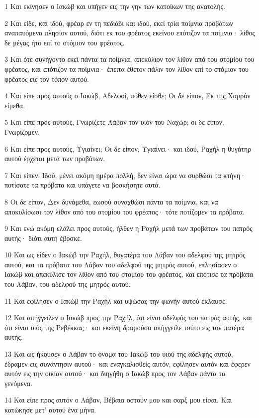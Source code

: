 \par 1 Και εκίνησεν ο Ιακώβ και υπήγεν εις την γην των κατοίκων της ανατολής.
\par 2 Και είδε, και ιδού, φρέαρ εν τη πεδιάδι και ιδού, εκεί τρία ποίμνια προβάτων αναπαυόμενα πλησίον αυτού, διότι εκ του φρέατος εκείνου επότιζον τα ποίμνια· λίθος δε μέγας ήτο επί το στόμιον του φρέατος.
\par 3 Και ότε συνήγοντο εκεί πάντα τα ποίμνια, απεκύλιον τον λίθον από του στομίου του φρέατος, και επότιζον τα ποίμνια· έπειτα έθετον πάλιν τον λίθον επί το στόμιον του φρέατος εις τον τόπον αυτού.
\par 4 Και είπε προς αυτούς ο Ιακώβ, Αδελφοί, πόθεν είσθε; Οι δε είπον, Εκ της Χαρράν είμεθα.
\par 5 Και είπε προς αυτούς, Γνωρίζετε Λάβαν τον υιόν του Ναχώρ; οι δε είπον, Γνωρίζομεν.
\par 6 Και είπε προς αυτούς, Υγιαίνει; Οι δε είπον, Υγιαίνει· και ιδού, Ραχήλ η θυγάτηρ αυτού έρχεται μετά των προβάτων.
\par 7 Και είπεν, Ιδού, μένει ακόμη ημέρα πολλή, δεν είναι ώρα να συρθώσι τα κτήνη· ποτίσατε τα πρόβατα και υπάγετε να βοσκήσητε αυτά.
\par 8 Οι δε είπον, Δεν δυνάμεθα, εωσού συναχθώσι πάντα τα ποίμνια, και να αποκυλίσωσι τον λίθον από του στομίου του φρέατος· τότε ποτίζομεν τα πρόβατα.
\par 9 Και ενώ ακόμη ελάλει προς αυτούς, ήλθεν η Ραχήλ μετά των προβάτων του πατρός αυτής· διότι αυτή έβοσκε.
\par 10 Και ως είδεν ο Ιακώβ την Ραχήλ, θυγατέρα του Λάβαν του αδελφού της μητρός αυτού, και τα πρόβατα του Λάβαν του αδελφού της μητρός αυτού, επλησίασεν ο Ιακώβ και απεκύλισε τον λίθον από του στομίου του φρέατος, και επότισε τα πρόβατα του Λάβαν, του αδελφού της μητρός αυτού.
\par 11 Και εφίλησεν ο Ιακώβ την Ραχήλ και υψώσας την φωνήν αυτού έκλαυσε.
\par 12 Και απήγγειλεν ο Ιακώβ προς την Ραχήλ, ότι είναι αδελφός του πατρός αυτής, και ότι είναι υιός της Ρεβέκκας· και εκείνη δραμούσα απήγγειλε τούτο εις τον πατέρα αυτής.
\par 13 Και ως ήκουσεν ο Λάβαν το όνομα του Ιακώβ του υιού της αδελφής αυτού, έδραμεν εις συνάντησιν αυτού· και εναγκαλισθείς αυτόν, εφίλησεν αυτόν και έφερεν αυτόν εις την οικίαν αυτού· και διηγήθη ο Ιακώβ προς τον Λάβαν πάντα τα γενόμενα.
\par 14 Και είπε προς αυτόν ο Λάβαν, Βέβαια οστούν μου και σαρξ μου είσαι. Και κατώκησε μετ' αυτού ένα μήνα.

